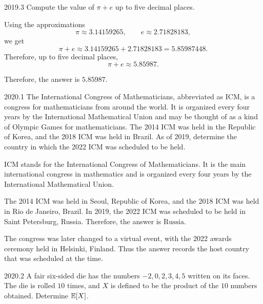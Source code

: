     \begin{pastproblem}{2019.3}
        Compute the value of $\pi+e$ up to five decimal places.
    \end{pastproblem}

    \begin{solution}
        Using the approximations
        \[
            \pi\approx 3.14159265,
            \qquad
            e\approx 2.71828183,
        \]
        we get
        \[
            \pi+e
            \approx
            3.14159265+2.71828183
            =
            5.85987448.
        \]
        Therefore, up to five decimal places,
        \[
            \pi+e\approx 5.85987.
        \]

        Therefore, the answer is $\boxed{5.85987}$.
    \end{solution}

    \begin{pastproblem}{2020.1}
        The International Congress of Mathematicians, abbreviated as ICM, is a congress for
        mathematicians from around the world. It is organized every four years by the International
        Mathematical Union and may be thought of as a kind of Olympic Games for mathematicians. The
        2014 ICM was held in the Republic of Korea, and the 2018 ICM was held in Brazil. As of 2019, determine
        the country in which the 2022 ICM was scheduled to be held.
    \end{pastproblem}

    \begin{solution}
        ICM stands for the International Congress of Mathematicians. It is the main international
        congress in mathematics and is organized every four years by the International Mathematical
        Union.

        The 2014 ICM was held in Seoul, Republic of Korea, and the 2018 ICM was held in Rio de Janeiro,
        Brazil. In 2019, the 2022 ICM was scheduled to be held in Saint Petersburg, Russia.
        Therefore, the answer is $\boxed{\text{Russia}}$.

        The congress was later changed to a virtual event, with the 2022 awards ceremony held in
        Helsinki, Finland. Thus the answer records the host country that was scheduled at the time.
    \end{solution}

    \begin{pastproblem}{2020.2}
        A fair six-sided die has the numbers $-2,0,2,3,4,5$ written on its faces. The die is rolled
        $10$ times, and $X$ is defined to be the product of the $10$ numbers obtained. Determine
        $\mathbb{E}[X]$.
    \end{pastproblem}


